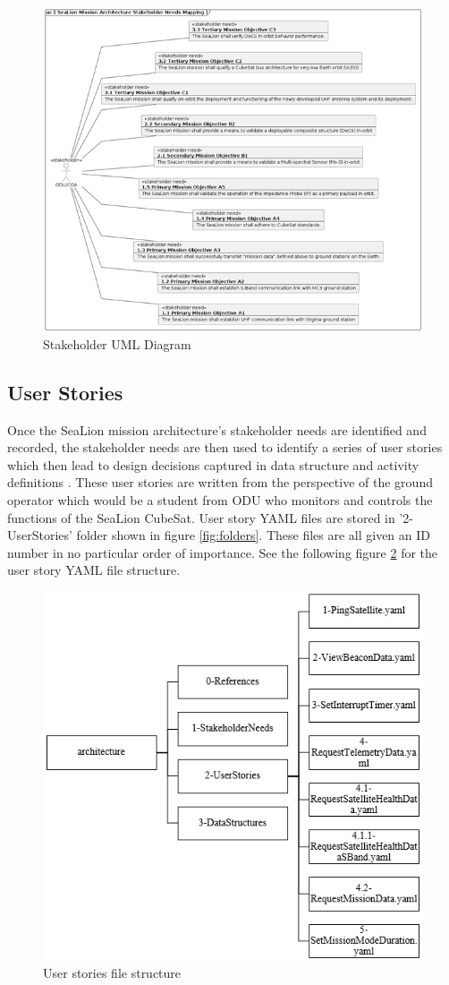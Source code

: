 \documentclass[journal,article,submit,pdftex,moreauthors]{Definitions/mdpi}
\begin{document}
\begin{figure}[H]
    \includegraphics[width=10.5 cm]{assets/uml_stakeholder.png}
    \caption{Stakeholder UML Diagram}
	\label{fig:uml_stakeholder}
    \end{figure}   
\unskip

\subsection{User Stories}
Once the SeaLion mission architecture's stakeholder needs are identified and recorded, the stakeholder needs are then used to identify a series of user stories which then lead to design decisions captured in data structure and activity definitions \cite{sealion_page}.  These user stories are written from the perspective of the ground operator which would be a student from ODU who monitors and controls the functions of the SeaLion CubeSat.  User story YAML files are stored in '2-UserStories' folder shown in figure \ref{fig:folders}.  These files are all given an ID number in no particular order of importance.  See the following figure \ref{fig:userstory_file} for the user story YAML file structure.

\begin{figure}[H]
    \includegraphics[width=10.5 cm]{assets/userstory_file.png}
    \caption{User stories file structure}
	\label{fig:userstory_file}
    \end{figure}
	\noindent   
\unskip
\end{document}
